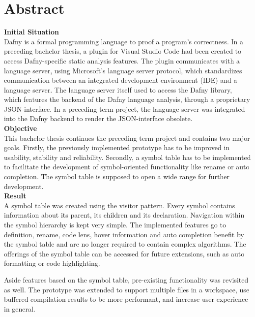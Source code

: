 \section{Abstract}
\label{section:abstract}


\textbf{Initial Situation}\\
Dafny is a formal programming language to proof a program's correctness.
In a preceding bachelor thesis, a plugin for Visual Studio Code had been created to access Dafny-specific static analysis features.
The plugin communicates with a language server, using Microsoft's language server protocol, which standardizes communication between an integrated development environment (IDE) and a language server.
The language server itself used to access the Dafny library, which features the backend of the Dafny language analysis, through a proprietary JSON-interface.
In a preceding term project, the language server was integrated into the Dafny backend to render the JSON-interface obsolete.\\

\textbf{Objective}\\
This bachelor thesis continues the preceding term project and contains two major goals.
Firstly, the previously implemented prototype has to be improved in usability, stability and reliability.
Secondly, a symbol table has to be implemented to facilitate the development of symbol-oriented functionality like rename or auto completion.
The symbol table is supposed to open a wide range for further development.\\

\textbf{Result}\\
A symbol table was created using the visitor pattern.
Every symbol contains information about its parent, its children and its declaration.
Navigation within the symbol hierarchy is kept very simple.
The implemented features go to definition, rename, code lens, hover information and auto completion benefit by the symbol table and are no longer required to contain complex algorithms.
The offerings of the symbol table can be accessed for future extensions, such as auto formatting or code highlighting.\\



Aside features based on the symbol table, pre-existing functionality was revisited as well.
The prototype was extended to support multiple files in a workspace, use buffered compilation results to be more performant, and increase user experience in general.
